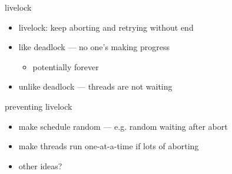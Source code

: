 \begin{frame}{livelock}
\begin{itemize}
\item livelock: keep aborting and retrying without end
\vspace{.5cm}
\item like deadlock --- no one's making progress
    \begin{itemize}
    \item potentially forever
    \end{itemize}
\item unlike deadlock --- threads are not waiting
\end{itemize}
\end{frame}

\begin{frame}{preventing livelock}
    \begin{itemize}
    \item make schedule random --- e.g. random waiting after abort
    \item make threads run one-at-a-time if lots of aborting
    \item other ideas?
    \end{itemize}
\end{frame}
